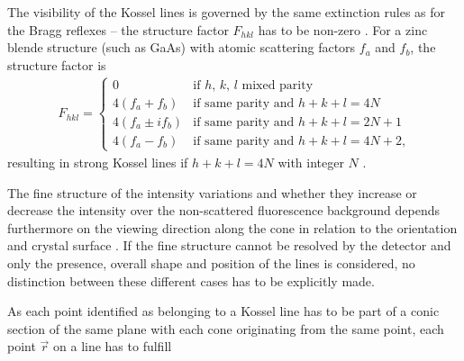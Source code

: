 The visibility of the Kossel lines is governed by the same extinction rules as for the Bragg reflexes -- the structure factor $F_{hkl}$ has to be non-zero \cite{cowley1995}. For a zinc blende structure (such as GaAs) with atomic scattering factors $f_a$ and $f_b$, the structure factor is
\begin{align}
F_{hkl} = \begin{cases}
0 & \text{if $h$, $k$, $l$ mixed parity}\\
4(f_a+f_b) & \text{if same parity and $h+k+l = 4 N$} \\
4(f_a\pm i f_b)& \text{if same parity and $h+k+l = 2 N+1$} \\
4(f_a-f_b) & \text{if same parity and $h+k+l = 4 N+2$,}
\end{cases}
\end{align}
resulting in strong Kossel lines if $h+k+l=4N$ with integer $N$  \cite{reimer2013}.

The fine structure of the intensity variations and whether they increase or decrease the intensity over the non-scattered fluorescence background depends furthermore on the viewing direction along the cone in relation to the orientation and crystal surface \cite{faigel2016}. If the fine structure cannot be resolved by the detector and only the presence, overall shape and position of the lines is considered, no distinction between these different cases has to be explicitly made.

As each point identified as belonging to a Kossel line has to be part of a conic section of the same plane with each cone originating from the same point, each point $\vec{r}$ on a line has to fulfill

